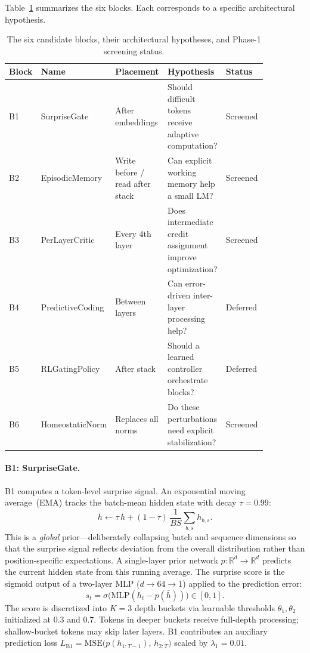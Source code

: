 \documentclass[11pt]{article}
\begin{document}
Table~\ref{tab:block-overview} summarizes the six blocks.
Each corresponds to a specific architectural hypothesis.

\begin{table}[t]
\centering
\small
\begin{tabular}{>{\raggedright\arraybackslash}p{0.06\linewidth}
                >{\raggedright\arraybackslash}p{0.16\linewidth}
                >{\raggedright\arraybackslash}p{0.22\linewidth}
                >{\raggedright\arraybackslash}p{0.20\linewidth}
                >{\raggedright\arraybackslash}p{0.22\linewidth}}
\toprule
Block & Name & Placement & Hypothesis & Status \\
\midrule
B1 & SurpriseGate & After embeddings & Should difficult tokens receive adaptive computation? & Screened \\
B2 & EpisodicMemory & Write before / read after stack & Can explicit working memory help a small LM? & Screened \\
B3 & PerLayerCritic & Every 4th layer & Does intermediate credit assignment improve optimization? & Screened \\
B4 & PredictiveCoding & Between layers & Can error-driven inter-layer processing help? & Deferred \\
B5 & RLGatingPolicy & After stack & Should a learned controller orchestrate blocks? & Deferred \\
B6 & HomeostaticNorm & Replaces all norms & Do these perturbations need explicit stabilization? & Screened \\
\bottomrule
\end{tabular}
\caption{The six candidate blocks, their architectural hypotheses,
and Phase-1 screening status.}
\label{tab:block-overview}
\end{table}

\paragraph{B1: SurpriseGate.}
B1 computes a token-level surprise signal.
An exponential moving average~(EMA) tracks the batch-mean hidden state with
decay $\tau = 0.99$:
\[
\bar{h} \leftarrow \tau\,\bar{h}
  + (1 - \tau)\,\frac{1}{BS}\sum_{b,s} h_{b,s}.
\]
This is a \emph{global} prior---deliberately collapsing batch and sequence
dimensions so that the surprise signal reflects deviation from the overall
distribution rather than position-specific expectations.
A single-layer prior network $p\colon \mathbb{R}^d \to \mathbb{R}^d$ predicts
the current hidden state from this running average.
The surprise score is the sigmoid output of a two-layer MLP
($d \to 64 \to 1$) applied to the prediction error:
\[
s_t = \sigma\!\bigl(\mathrm{MLP}(h_t - p(\bar{h}))\bigr) \in [0,1].
\]
The score is discretized into $K{=}3$ depth buckets via learnable thresholds
$\theta_1, \theta_2$ initialized at 0.3 and 0.7.
Tokens in deeper buckets receive full-depth processing; shallow-bucket tokens
may skip later layers.
B1 contributes an auxiliary prediction loss
$L_{\mathrm{B1}} = \mathrm{MSE}\!\bigl(p(h_{1:T-1}),\, h_{2:T}\bigr)$
scaled by $\lambda_1 = 0.01$.
\end{document}
